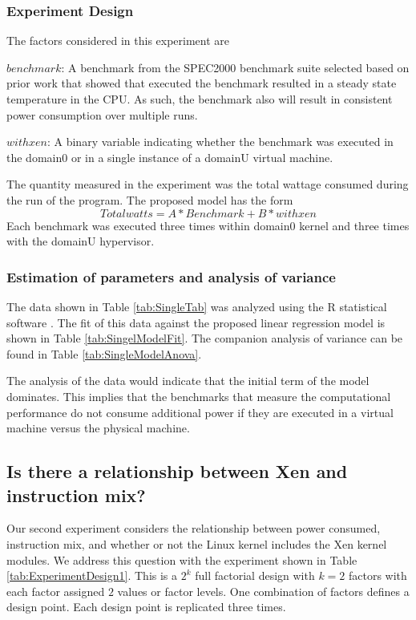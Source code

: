 \documentclass[preprint]{sigplanconf}
\begin{document}
\subsubsection{Experiment Design}
The factors considered in this experiment are
\begin{list}{}{}
\item $benchmark$: A benchmark from the SPEC2000 benchmark suite selected
  based on prior work \cite{Dondald2006} that showed that executed the
  benchmark resulted in a steady state temperature in the CPU. As such, the
  benchmark also will result in consistent power consumption over multiple runs.
\item $withxen$: A binary variable indicating whether the benchmark was
  executed in the domain0 or in a single instance of a domainU virtual machine.
\end{list}
The quantity measured in the experiment was the total wattage consumed during
the run of the program.   The proposed model has the form
\begin{equation*}
  \label{InitialModel1}
  Totalwatts = A*Benchmark + B*withxen
\end{equation*}
Each benchmark was executed three times within domain0 kernel and three times
with the domainU hypervisor.

\subsubsection{Estimation of parameters and analysis of variance}
The data shown in Table \ref{tab:SingleTab} was analyzed using the R statistical
software \cite{R2007}.  The fit of this data against the proposed linear
regression model is shown in Table \ref{tab:SingelModelFit}.  The companion
analysis of variance can be found in Table \ref{tab:SingleModelAnova}.  

The analysis of the data would indicate that the initial term of the model
dominates.  This implies that the benchmarks that measure the computational
performance do not consume additional power if they are executed in a virtual
machine versus the physical machine.

\subsection{Is there a relationship between Xen and instruction mix?}
\label{sec:XenAndInstructionMix}
Our second experiment considers the relationship between power consumed,
instruction mix, and whether or not the Linux kernel includes the Xen kernel
modules. We address this question with the experiment shown in Table
\ref{tab:ExperimentDesign1}.  This is a $2^{k}$ full factorial design with
$k=2$ factors with each factor assigned $2$ values or factor levels.  One
combination of factors defines a design point.  Each design point is
replicated three times.
\end{document}
